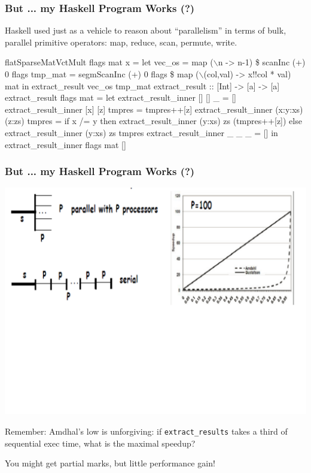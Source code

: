 \documentclass{beamer}
\renewcommand{\emph}[1]{\textcolor{structure}{#1}}
\newcommand{\mymath}[1]{$ #1 $}
\begin{document}
\begin{frame}[fragile,t]
\frametitle{But ... my Haskell Program Works (?)}

Haskell used just as a vehicle to reason about ``parallelism''
in terms of bulk, parallel primitive operators: 
map, reduce, scan, permute, write.\pause\medskip

\begin{colorcode}[fontsize=\scriptsize]
 flatSparseMatVctMult flags mat x = 
    let vec_os  = \emph{map (\mymath{\backslash}n -> n-1) \$ scanInc (+) 0 flags}
        tmp_mat = \emph{segmScanInc (+) 0 flags \$ map (\mymath{\backslash}(col,val) -> x!!col * val) mat}
    in \alert{extract_result vec_os tmp_mat}
extract_result :: [Int] -> [a] -> [a]
extract_result flags mat = let 
    extract_result_inner [] [] _ = []
    extract_result_inner [x] [z] tmpres = tmpres++[z]
    \alert{extract_result_inner} (x:y:xs) (z:zs) tmpres = 
        if x /= y
        then \alert{extract_result_inner} (y:xs) zs (tmpres++[z])
        else \alert{extract_result_inner} (y:xs) zs tmpres
    extract_result_inner _ _ _ = []
  in extract_result_inner flags mat []
\end{colorcode}

\end{frame}


\begin{frame}[fragile,t]
\frametitle{But ... my Haskell Program Works (?)}

\includegraphics[width=59ex]{Ch1Figs/AmdhalGustaff}
\vspace{-15ex}

\alert{Remember: Amdhal's low is unforgiving}: if  
{\tt extract\_results} takes a third of sequential 
exec time, what is the maximal speedup?
\medskip

You might get partial marks, but little performance gain!

\end{frame}
\end{document}
